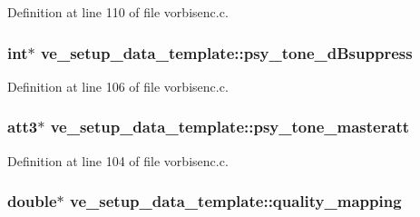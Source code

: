 Definition at line 110 of file vorbisenc.\+c.

\subsubsection[{\texorpdfstring{psy\+\_\+tone\+\_\+d\+Bsuppress}{psy_tone_dBsuppress}}]{ {\bf int}$\ast$ ve\+\_\+setup\+\_\+data\+\_\+template\+::psy\+\_\+tone\+\_\+d\+Bsuppress}\hypertarget{structve__setup__data__template_aa266e1f96c4a87730e81f8824edac277}{}\label{structve__setup__data__template_aa266e1f96c4a87730e81f8824edac277}


Definition at line 106 of file vorbisenc.\+c.

\subsubsection[{\texorpdfstring{psy\+\_\+tone\+\_\+masteratt}{psy_tone_masteratt}}]{ {\bf att3}$\ast$ ve\+\_\+setup\+\_\+data\+\_\+template\+::psy\+\_\+tone\+\_\+masteratt}\hypertarget{structve__setup__data__template_ab0c56a0e186b5c7f8e0e8d87a901d7e5}{}\label{structve__setup__data__template_ab0c56a0e186b5c7f8e0e8d87a901d7e5}


Definition at line 104 of file vorbisenc.\+c.

\subsubsection[{\texorpdfstring{quality\+\_\+mapping}{quality_mapping}}]{ double$\ast$ ve\+\_\+setup\+\_\+data\+\_\+template\+::quality\+\_\+mapping}\hypertarget{structve__setup__data__template_ad56fff2e50fc8c8ecb023810a505e067}{}\label{structve__setup__data__template_ad56fff2e50fc8c8ecb023810a505e067}


